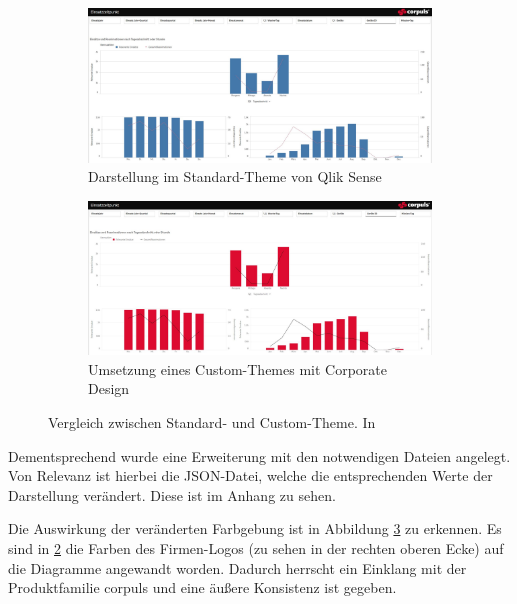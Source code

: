 \begin{figure}[ht]
\centering
\begin{subfigure}{1\linewidth}
  \centering
  \includegraphics[width=1\linewidth]{img/beforeCT}  
  \caption{Darstellung im Standard-Theme von Qlik Sense}
  \label{fig:beforeCT}
\end{subfigure}
\begin{subfigure}{1\linewidth}
  \centering
  \includegraphics[width=1\linewidth]{img/afterCT}  
  \caption{Umsetzung eines Custom-Themes mit Corporate Design}
  \label{fig:afterCT}
\end{subfigure}
\caption[Vergleich zwischen Standard- und Custom-Theme]{Vergleich zwischen Standard- und Custom-Theme. In }
\label{fig:custom}
\end{figure}

Dementsprechend wurde eine Erweiterung mit den notwendigen Dateien angelegt.
Von Relevanz ist hierbei die JSON-Datei, welche die entsprechenden Werte der Darstellung verändert.
Diese ist im Anhang  zu sehen.

Die Auswirkung der veränderten Farbgebung ist in Abbildung \ref{fig:custom} zu erkennen. 
Es sind in \ref{fig:afterCT} die Farben des Firmen-Logos (zu sehen in der rechten oberen Ecke) auf die Diagramme angewandt worden.
Dadurch herrscht ein Einklang mit der Produktfamilie \textsf{corpuls\color{corpulsred}{.web}} und eine äußere Konsistenz ist gegeben.



